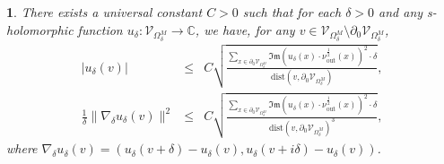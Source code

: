 \documentclass[oneside,english]{amsart}
\numberwithin{equation}{section}
\numberwithin{figure}{section}
\theoremstyle{plain}
\theoremstyle{plain}
\theoremstyle{plain}
\theoremstyle{plain}
\newtheorem{prop}[thm]{\protect\propositionname}
\theoremstyle{plain}
\theoremstyle{definition}
\theoremstyle{remark}
\providecommand{\propositionname}{Proposition}
\begin{document}
\begin{prop}
\label{pro:uniform-control}There exists a universal constant $C>0$
such that for each $\delta>0$ and any s-holomorphic function $u_{\delta}:\mathcal{V}_{\Omega_{\delta}^{M}}\to\mathbb{C}$,
we have, for any $v\in\mathcal{V}_{\Omega_{\delta}^{M}}\setminus\partial_{0}\mathcal{V}_{\Omega_{\delta}^{M}}$,
\begin{eqnarray*}
\left|u_{\delta}\left(v\right)\right| & \leq & C\sqrt{\frac{\sum_{x\in\partial_{0}\mathcal{V}_{\Omega_{\delta}^{M}}}\Im\mathfrak{m}\left(u_{\delta}\left(x\right)\cdot\nu_{\mathrm{out}}^{\frac{1}{2}}\left(x\right)\right)^{2}\cdot\delta}{\mathrm{dist}\left(v,\partial_{0}\mathcal{V}_{\Omega_{\delta}^{M}}\right)}},\\
\frac{1}{\delta}\|\nabla_{\delta}u_{\delta}\left(v\right)\|^{2} & \leq & C\sqrt{\frac{\sum_{x\in\partial_{0}\mathcal{V}_{\Omega_{\delta}^{M}}}\Im\mathfrak{m}\left(u_{\delta}\left(x\right)\cdot\nu_{\mathrm{out}}^{\frac{1}{2}}\left(x\right)\right)^{2}\cdot\delta}{\mathrm{dist}\left(v,\partial_{0}\mathcal{V}_{\Omega_{\delta}^{M}}\right)^{3}}},
\end{eqnarray*}
where $\nabla_{\delta}u_{\delta}\left(v\right)=\left(u_{\delta}\left(v+\delta\right)-u_{\delta}\left(v\right),u_{\delta}\left(v+i\delta\right)-u_{\delta}\left(v\right)\right)$. \end{prop}
\end{document}
